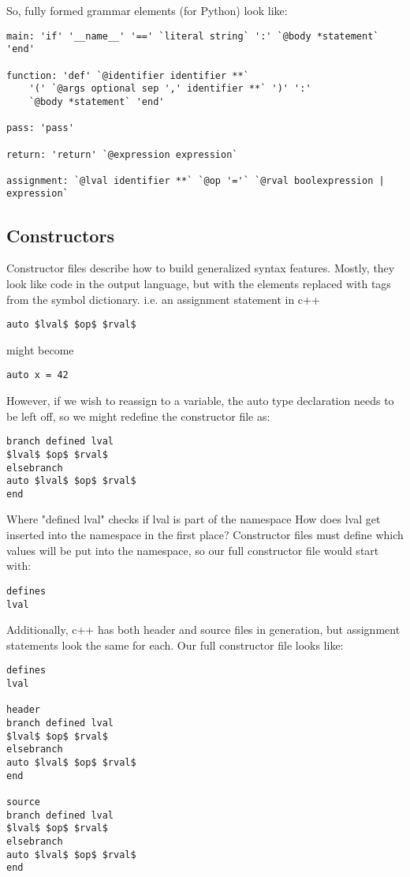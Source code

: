 \documentclass{article}
\begin{document}
So, fully formed grammar elements (for Python) look like:
\begin{verbatim}
main: 'if' '__name__' '==' `literal string` ':' `@body *statement` 'end'

function: 'def' `@identifier identifier **` 
    '(' `@args optional sep ',' identifier **` ')' ':' 
    `@body *statement` 'end' 

pass: 'pass'

return: 'return' `@expression expression`

assignment: `@lval identifier **` `@op '='` `@rval boolexpression | expression`
\end{verbatim}

\subsection{Constructors}

Constructor files describe how to build generalized syntax features. Mostly, they look like code in the output language, but with the elements replaced with tags from the symbol dictionary.
i.e. an assignment statement in c++
\lstset{language=c++}
\begin{lstlisting}
auto $lval$ $op$ $rval$
\end{lstlisting}
might become
\lstset{language=c++}
\begin{lstlisting}
auto x = 42
\end{lstlisting}
However, if we wish to reassign to a variable, the auto type declaration needs to be left off, so we might redefine the constructor file as:
\begin{verbatim}
branch defined lval 
$lval$ $op$ $rval$
elsebranch
auto $lval$ $op$ $rval$
end
\end{verbatim}
Where "defined lval" checks if lval is part of the namespace
How does lval get inserted into the namespace in the first place?
Constructor files must define which values will be put into the namespace, so our full constructor file would start with:
\begin{verbatim}
defines
lval
\end{verbatim}
Additionally, c++ has both header and source files in generation, but assignment statements look the same for each.
Our full constructor file looks like:

\begin{verbatim}
defines
lval

header
branch defined lval 
$lval$ $op$ $rval$
elsebranch
auto $lval$ $op$ $rval$
end

source
branch defined lval 
$lval$ $op$ $rval$
elsebranch
auto $lval$ $op$ $rval$
end
\end{verbatim}
\end{document}
